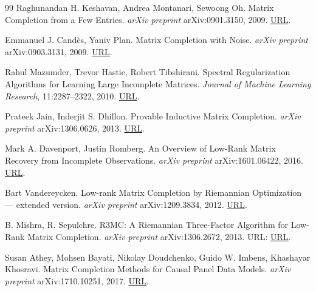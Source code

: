 \documentclass[a4paper,12pt]{article}
\begin{document}
\begin{thebibliography}{99}
    Raghunandan H. Keshavan, Andrea Montanari, Sewoong Oh.
    \newblock Matrix Completion from a Few Entries.
    \newblock \textit{arXiv preprint} arXiv:0901.3150, 2009.
    \newblock \href{https://arxiv.org/abs/0901.3150}{URL}.

    Emmanuel J. Cand\`es, Yaniv Plan.
    \newblock Matrix Completion with Noise.
    \newblock \textit{arXiv preprint} arXiv:0903.3131, 2009.
    \newblock \href{https://arxiv.org/abs/0903.3131}{URL}.

    Rahul Mazumder, Trevor Hastie, Robert Tibshirani.
    \newblock Spectral Regularization Algorithms for Learning Large Incomplete Matrices.
    \newblock \textit{Journal of Machine Learning Research}, 11:2287--2322, 2010.
    \newblock \href{https://www.jmlr.org/papers/v11/mazumder10a.html}{URL}.

    Prateek Jain, Inderjit S. Dhillon.
    \newblock Provable Inductive Matrix Completion.
    \newblock \textit{arXiv preprint} arXiv:1306.0626, 2013.
    \newblock \href{https://arxiv.org/abs/1306.0626}{URL}.

    Mark A. Davenport, Justin Romberg.
    \newblock An Overview of Low-Rank Matrix Recovery from Incomplete Observations.
    \newblock \textit{arXiv preprint} arXiv:1601.06422, 2016.
    \newblock \href{https://arxiv.org/abs/1601.06422}{URL}.

    Bart Vandereycken.
    \newblock Low-rank Matrix Completion by Riemannian Optimization --- extended version.
    \newblock \textit{arXiv preprint} arXiv:1209.3834, 2012.
    \newblock \href{https://arxiv.org/abs/1209.3834}{URL}.

    B. Mishra, R. Sepulchre.
    \newblock R3MC: A Riemannian Three-Factor Algorithm for Low-Rank Matrix Completion.
    \newblock \textit{arXiv preprint} arXiv:1306.2672, 2013.
    \newblock URL: \href{https://arxiv.org/abs/1306.2672}{URL}.

    Susan Athey, Mohsen Bayati, Nikolay Doudchenko, Guido W. Imbens, Khashayar Khosravi.
    \newblock Matrix Completion Methods for Causal Panel Data Models.
    \newblock \textit{arXiv preprint} arXiv:1710.10251, 2017.
    \newblock \href{https://arxiv.org/abs/1710.10251}{URL}.

\end{thebibliography}
\end{document}

